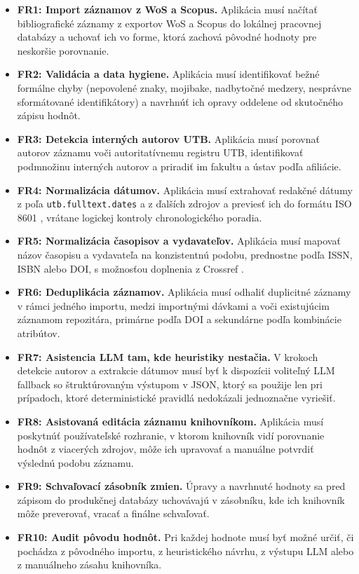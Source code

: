 \begin{itemize}
    \item \textbf{FR1: Import záznamov z WoS a Scopus.} Aplikácia musí načítať bibliografické záznamy z exportov WoS a Scopus do lokálnej pracovnej databázy a uchovať ich vo forme, ktorá zachová pôvodné hodnoty pre neskoršie porovnanie.
    \item \textbf{FR2: Validácia a data hygiene.} Aplikácia musí identifikovať bežné formálne chyby (nepovolené znaky, mojibake, nadbytočné medzery, nesprávne sformátované identifikátory) a navrhnúť ich opravy oddelene od skutočného zápisu hodnôt.
    \item \textbf{FR3: Detekcia interných autorov UTB.} Aplikácia musí porovnať autorov záznamu voči autoritatívnemu registru UTB, identifikovať podmnožinu interných autorov a priradiť im fakultu a ústav podľa afiliácie.
    \item \textbf{FR4: Normalizácia dátumov.} Aplikácia musí extrahovať redakčné dátumy z poľa \texttt{utb.fulltext.dates} a z ďalších zdrojov a previesť ich do formátu ISO 8601 \cite{ISO8601_2019}, vrátane logickej kontroly chronologického poradia.
    \item \textbf{FR5: Normalizácia časopisov a vydavateľov.} Aplikácia musí mapovať názov časopisu a vydavateľa na konzistentnú podobu, prednostne podľa ISSN, ISBN alebo DOI, s možnosťou doplnenia z Crossref \cite{CrossrefRESTAPI,ISSNWhatIs}.
    \item \textbf{FR6: Deduplikácia záznamov.} Aplikácia musí odhaliť duplicitné záznamy v rámci jedného importu, medzi importnými dávkami a voči existujúcim záznamom repozitára, primárne podľa DOI a sekundárne podľa kombinácie atribútov.
    \item \textbf{FR7: Asistencia LLM tam, kde heuristiky nestačia.} V krokoch detekcie autorov a extrakcie dátumov musí byť k dispozícii voliteľný LLM fallback so štruktúrovaným výstupom v JSON, ktorý sa použije len pri prípadoch, ktoré deterministické pravidlá nedokázali jednoznačne vyriešiť.
    \item \textbf{FR8: Asistovaná editácia záznamu knihovníkom.} Aplikácia musí poskytnúť používateľské rozhranie, v ktorom knihovník vidí porovnanie hodnôt z viacerých zdrojov, môže ich upravovať a manuálne potvrdiť výslednú podobu záznamu.
    \item \textbf{FR9: Schvaľovací zásobník zmien.} Úpravy a navrhnuté hodnoty sa pred zápisom do produkčnej databázy uchovávajú v zásobníku, kde ich knihovník môže preverovať, vracať a finálne schvaľovať.
    \item \textbf{FR10: Audit pôvodu hodnôt.} Pri každej hodnote musí byť možné určiť, či pochádza z pôvodného importu, z heuristického návrhu, z výstupu LLM alebo z manuálneho zásahu knihovníka.
\end{itemize}

